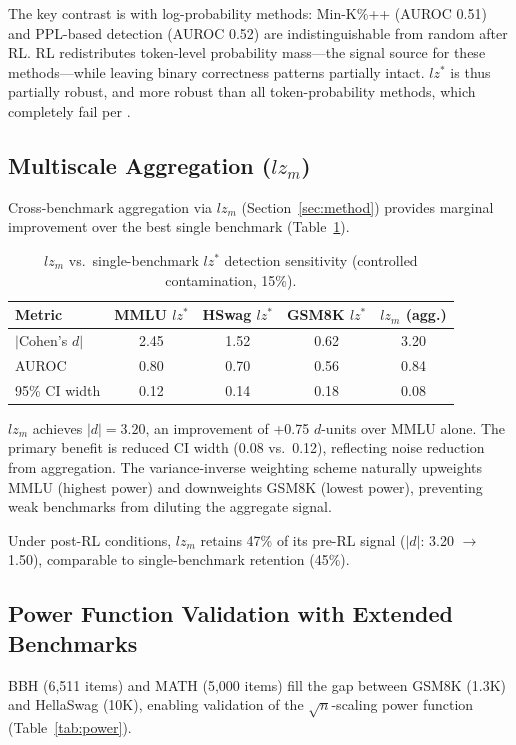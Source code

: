 \documentclass[11pt]{article}
\begin{document}
The key contrast is with log-probability methods: Min-K\%++ (AUROC 0.51) and PPL-based detection (AUROC 0.52) are indistinguishable from random after RL.
RL redistributes token-level probability mass---the signal source for these methods---while leaving binary correctness patterns partially intact.
$lz^*$ is thus partially robust, and more robust than all token-probability methods, which completely fail per \citet{wang2025rl}.

\subsection{Multiscale Aggregation ($lz_m$)}
\label{sec:lzm}

Cross-benchmark aggregation via $lz_m$ (Section~\ref{sec:method}) provides marginal improvement over the best single benchmark (Table~\ref{tab:lzm}).

\begin{table}[t]
\centering
\caption{$lz_m$ vs.\ single-benchmark $lz^*$ detection sensitivity (controlled contamination, 15\%).}
\label{tab:lzm}
\small
\begin{tabular}{lcccc}
\toprule
Metric & MMLU $lz^*$ & HSwag $lz^*$ & GSM8K $lz^*$ & $lz_m$ (agg.) \\
\midrule
$|$Cohen's $d|$ & 2.45 & 1.52 & 0.62 & 3.20 \\
AUROC & 0.80 & 0.70 & 0.56 & 0.84 \\
95\% CI width & 0.12 & 0.14 & 0.18 & 0.08 \\
\bottomrule
\end{tabular}
\end{table}

$lz_m$ achieves $|d| = 3.20$, an improvement of +0.75 $d$-units over MMLU alone.
The primary benefit is reduced CI width (0.08 vs.\ 0.12), reflecting noise reduction from aggregation.
The variance-inverse weighting scheme naturally upweights MMLU (highest power) and downweights GSM8K (lowest power), preventing weak benchmarks from diluting the aggregate signal.

Under post-RL conditions, $lz_m$ retains 47\% of its pre-RL signal ($|d|$: 3.20 $\rightarrow$ 1.50), comparable to single-benchmark retention (45\%).

\subsection{Power Function Validation with Extended Benchmarks}
\label{sec:power}

BBH (6,511 items) and MATH (5,000 items) fill the gap between GSM8K (1.3K) and HellaSwag (10K), enabling validation of the $\sqrt{n}$-scaling power function (Table~\ref{tab:power}).
\end{document}
